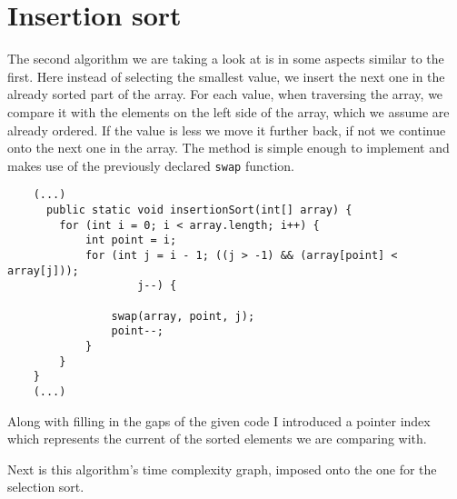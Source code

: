 \documentclass[a4paper,11pt]{article}
\begin{document}
\section*{Insertion sort}

The second algorithm we are taking a look at is in some aspects similar to the first. Here instead of selecting the smallest
value, we insert the next one in the already sorted part of the array. For each value, when traversing the array, we compare it with the elements on the left side of the array, which we assume are already ordered. If the value is less we move it further back, if not we continue onto the next one in the array.
The method is simple enough to implement and makes use of the previously declared {\tt swap} function.


\begin{verbatim}
    (...)
      public static void insertionSort(int[] array) {
        for (int i = 0; i < array.length; i++) {
            int point = i;
            for (int j = i - 1; ((j > -1) && (array[point] < array[j])); 
                    j--) {
                    
                swap(array, point, j);
                point--;
            }
        }
    }
    (...)
\end{verbatim} 

Along with filling in the gaps of the given code I introduced a pointer index which represents the current of the sorted elements we are comparing with.

Next is this algorithm's time complexity graph, imposed onto the one for the selection sort. 
\end{document}
